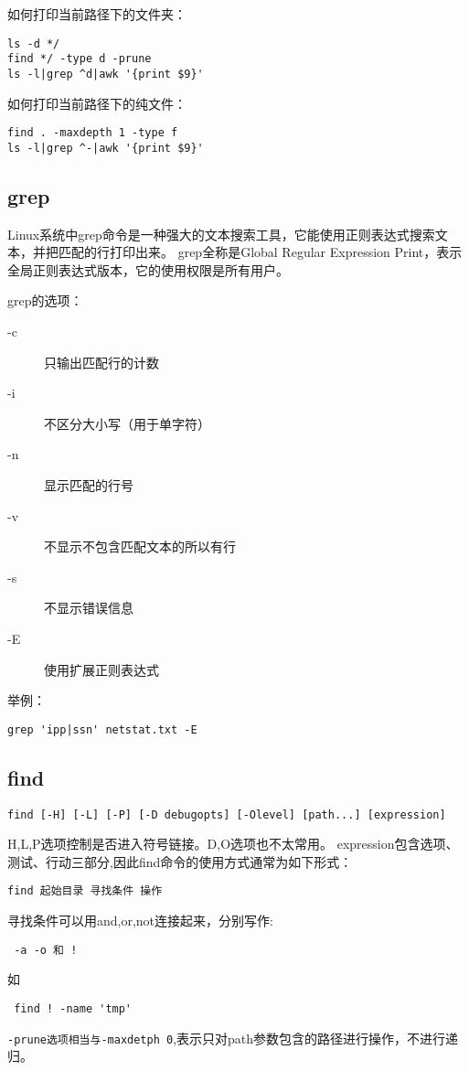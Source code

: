 如何打印当前路径下的文件夹：
\begin{verbatim}
ls -d */
find */ -type d -prune
ls -l|grep ^d|awk '{print $9}'
\end{verbatim}

如何打印当前路径下的纯文件：
\begin{verbatim}
find . -maxdepth 1 -type f
ls -l|grep ^-|awk '{print $9}'
\end{verbatim}

\subsection{grep}

Linux系统中grep命令是一种强大的文本搜索工具，它能使用正则表达式搜索文本，并把匹配的行打印出来。
grep全称是Global Regular Expression Print，表示全局正则表达式版本，它的使用权限是所有用户。

grep的选项：
\begin{description}
	\item[-c]只输出匹配行的计数
	\item[-i]不区分大小写（用于单字符）
	\item[-n]显示匹配的行号
	\item[-v]不显示不包含匹配文本的所以有行
	\item[-s]不显示错误信息
	\item[-E] 使用扩展正则表达式
\end{description}

举例：
\begin{verbatim}
grep 'ipp|ssn' netstat.txt -E
\end{verbatim}


\subsection{find}
\begin{verbatim}
find [-H] [-L] [-P] [-D debugopts] [-Olevel] [path...] [expression]
\end{verbatim}
H,L,P选项控制是否进入符号链接。D,O选项也不太常用。
expression包含选项、测试、行动三部分,因此find命令的使用方式通常为如下形式：

\verb+find 起始目录 寻找条件 操作+

寻找条件可以用and,or,not连接起来，分别写作:

\verb+ -a -o 和 !+

如

\verb+ find ! -name 'tmp'+

\verb+-prune选项相当与-maxdetph 0+,表示只对path参数包含的路径进行操作，不进行递归。


